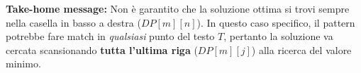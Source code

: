 \documentclass[12pt, a4paper]{article}
\begin{document}
\textbf{Take-home message:} Non è garantito che la soluzione ottima si trovi sempre nella casella in basso a destra ($DP[m][n]$). In questo caso specifico, il pattern potrebbe fare match in \textit{qualsiasi} punto del testo $T$, pertanto la soluzione va cercata scansionando \textbf{tutta l'ultima riga} ($DP[m][j]$) alla ricerca del valore minimo.
\end{document}
